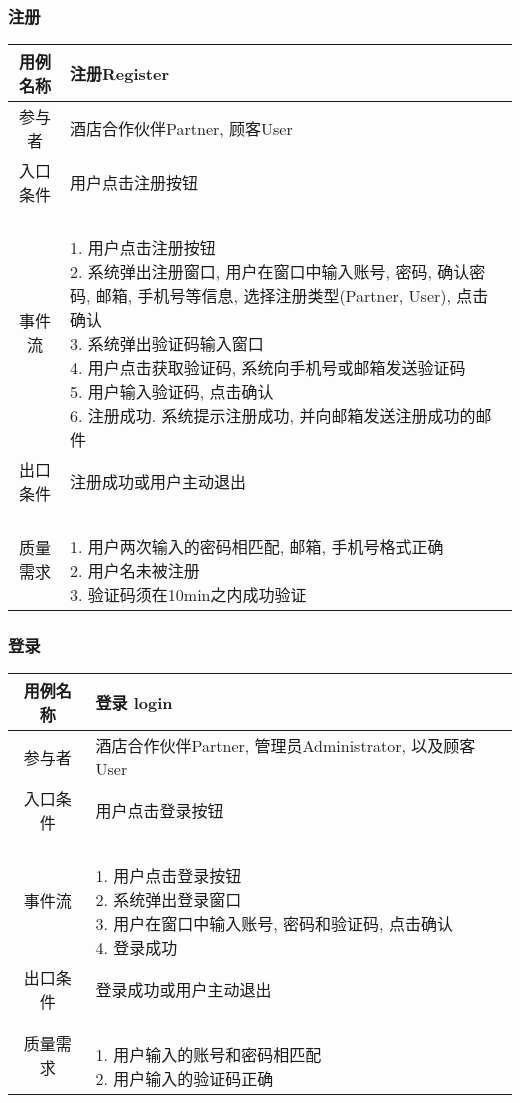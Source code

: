 \documentclass[11pt]{article}
\begin{document}
		\subsubsection{注册}
			\begin{tabular}{c|l}
			\hline
			用例名称 & 注册Register \\ \hline
			参与者 & 酒店合作伙伴Partner, 顾客User  \\ \hline
			入口条件 & 用户点击注册按钮 \\ \hline
			事件流 & 	\parbox{33em}{\ \\
						1. 用户点击注册按钮 \\
						2. 系统弹出注册窗口, 用户在窗口中输入账号, 密码, 确认密码, 邮箱, 手机号等信息, 选择注册类型(Partner, User), 点击确认  \\
						3. 系统弹出验证码输入窗口 \\
						4. 用户点击获取验证码, 系统向手机号或邮箱发送验证码 \\
						5. 用户输入验证码, 点击确认 \\
						6. 注册成功. 系统提示注册成功, 并向邮箱发送注册成功的邮件 \\
						} \\ \hline
			出口条件 & 注册成功或用户主动退出 \\ \hline
			质量需求 & \parbox{33em}{\ \\
						1. 用户两次输入的密码相匹配, 邮箱, 手机号格式正确 \\ 
						2. 用户名未被注册 \\
						3. 验证码须在10min之内成功验证 \\
						} \\ \hline
			\end{tabular}

		
		
		\subsubsection{登录}
			\begin{tabular}{c|l}
			\hline
			用例名称 & 登录 login \\ \hline
			参与者 & 酒店合作伙伴Partner, 管理员Administrator, 以及顾客User  \\ \hline
			入口条件 & 用户点击登录按钮 \\ \hline
			事件流 & 	\parbox{33em}{\ \\
						1. 用户点击登录按钮 \\
						2. 系统弹出登录窗口 \\
						3. 用户在窗口中输入账号, 密码和验证码, 点击确认  \\
						4. 登录成功 \\
						} \\ \hline
			出口条件 & 登录成功或用户主动退出 \\ \hline
			质量需求 & \parbox{33em}{\ \\
						1. 用户输入的账号和密码相匹配 \\
						2. 用户输入的验证码正确 \\
						} \\ \hline
			\end{tabular}
			
\end{document}
